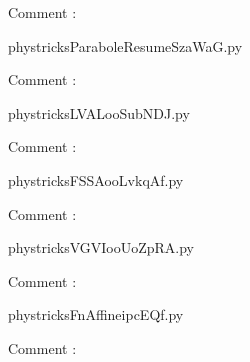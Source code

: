     Comment : 

    \clearpage
    


    \newcommand{\CaptionFigParaboleResumeSzaWaG}{<+Type your caption here+>}
    \begin{center}
        
    \end{center}
    phystricksParaboleResumeSzaWaG.py

    Comment : 

    \clearpage
    


    \newcommand{\CaptionFigLVALooSubNDJ}{<+Type your caption here+>}
    \begin{center}
        
    \end{center}
    phystricksLVALooSubNDJ.py

    Comment : 

    \clearpage
    


    \newcommand{\CaptionFigFSSAooLvkqAf}{<+Type your caption here+>}
    \begin{center}
        
    \end{center}
    phystricksFSSAooLvkqAf.py

    Comment : 

    \clearpage
    


    \newcommand{\CaptionFigVGVIooUoZpRA}{<+Type your caption here+>}
    \begin{center}
        
    \end{center}
    phystricksVGVIooUoZpRA.py

    Comment : 

    \clearpage
    


    \newcommand{\CaptionFigFnAffineipcEQf}{<+Type your caption here+>}
    \begin{center}
        
    \end{center}
    phystricksFnAffineipcEQf.py

    Comment : 

